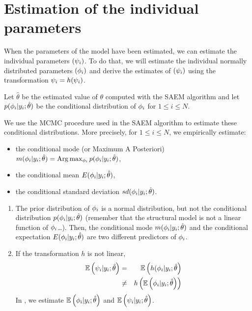 \section{Estimation of the individual parameters} \label{section_indivparam}

When the parameters of the model have been estimated, we can estimate the individual parameters $({\psi_i})$. To do that, we will estimate the individual normally distributed parameters $({{\phi}_i})$ and derive the estimates of $({\psi_i})$ using the transformation ${\psi_i}= h({\psi_i})$.

Let $\hat{\theta}$ be the estimated value of $\theta$ computed with the SAEM algorithm and let $p({{\phi}_i}|y_i;\hat{\theta})$ be the conditional
distribution of ${{\phi}_i}$ for $1\leq i \leq N$.

We use the MCMC procedure used in the SAEM algorithm to estimate these conditional distributions. More precisely, for $1\leq i \leq
N$, we empirically estimate:

\begin{itemize}
  \item the  conditional mode (or Maximum A Posteriori)
  $ m({{\phi}_i}|y_i;\hat{\theta})={\rm Arg}\max_{{\phi}_i} p({{\phi}_i}|y_i;\hat{\theta})$,
  \item the conditional mean
  $ E({{\phi}_i}|y_i;\hat{\theta})$,
  \item the conditional standard deviation
 $ sd({{\phi}_i}|y_i;\hat{\theta})$.
 \end{itemize}

 \begin{enumerate}
  \item The prior distribution of ${{\phi}_i}$ is a normal distribution, but not the conditional distribution $p({{\phi}_i}|y_i;\hat{\theta})$ (remember that the structural model is not a linear function of ${{\phi}_i}$\ldots). Then, the conditional mode $m({{\phi}_i}|y_i;\hat{\theta})$ and the conditional expectation $ E({{\phi}_i}|y_i;\hat{\theta})$ are two different predictors of ${{\phi}_i}$.
      \item If the transformation $h$ is not linear,
      \begin{eqnarray*}
       \mathbb{E}\left({\psi_i}|y_i;\hat{\theta}\right) &=&  \mathbb{E}\left(h({{\phi}_i}|y_i;\hat{\theta}\right) \\
       &\neq& h\left(\mathbb{E}\left({{\phi}_i}|y_i;\hat{\theta}\right)  \right)
       \end{eqnarray*}
       In \monolix, we estimate $\mathbb{E}\left({{\phi}_i}|y_i;\hat{\theta}\right)$ and $\mathbb{E}\left({\psi_i}|y_i;\hat{\theta}\right)$.
\end{enumerate}

